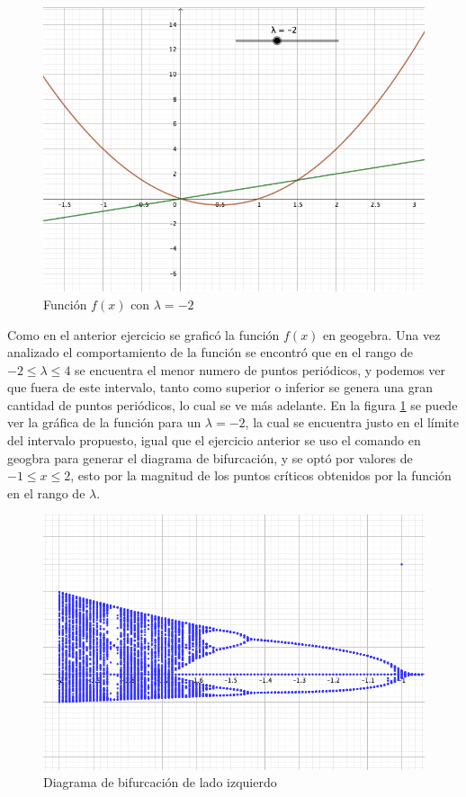 \documentclass[11pt]{report}
\theoremstyle{plain}
\theoremstyle{definition}
\begin{document}
\begin{figure}[!h] %
	\centering
	\includegraphics[scale=0.3]{caos_2_1.png}
	\caption{Función $f(x)$ con $\lambda = -2$}
	\label{fig:Eje2_1}
\end{figure}

Como en el anterior ejercicio se graficó la función $f(x)$ en geogebra. Una vez analizado el comportamiento de la función se encontró que en el rango de $-2 \leq \lambda \leq 4$ se encuentra el menor numero de puntos periódicos, y podemos ver que fuera de este intervalo, tanto como superior o inferior se genera una gran cantidad de puntos periódicos, lo cual se ve más adelante. En la figura \ref{fig:Eje2_1} se puede ver la gráfica de la función para un $\lambda = -2$, la cual se encuentra justo en el límite del intervalo propuesto, igual que el ejercicio anterior se uso el comando en geogbra para generar el diagrama de bifurcación, y se optó por valores de $-1 \leq x \leq 2$, esto por la magnitud de los puntos críticos obtenidos por la función en el rango de $\lambda$.\\


\begin{figure}[!h] %
	\centering
	\includegraphics[scale=0.3]{caos_2_2.png}
	\caption{Diagrama de bifurcación de lado izquierdo}
	\label{fig:Eje2_2}
\end{figure}
\end{document}
